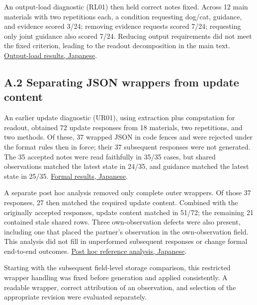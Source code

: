 \documentclass[10pt,a4paper]{article}
\begin{document}
An output-load diagnostic (RL01) then held correct notes fixed. Across 12 main materials with two repetitions each, a condition requesting dog/cat, guidance, and evidence scored 3/24; removing evidence requests scored 7/24; requesting only joint guidance also scored 7/24. Reducing output requirements did not meet the fixed criterion, leading to the readout decomposition in the main text. \href{https://github.com/metaSATOKEN/MRSI/blob/9443de315d283874df0c27e0e99b8c04f400709d/experiments/RL01/docs/readout-load-01-result-2026-09-25.md}{Output-load results, Japanese}.

\subsection{A.2 Separating JSON wrappers from update content}\label{paper-02-a.2-separating-json-wrappers-from-update-content}

An earlier update diagnostic (UR01), using extraction plus computation for readout, obtained 72 update responses from 18 materials, two repetitions, and two methods. Of these, 37 wrapped JSON in code fences and were rejected under the format rules then in force; their 37 subsequent responses were not generated. The 35 accepted notes were read faithfully in 35/35 cases, but shared observations matched the latest state in 24/35, and guidance matched the latest state in 25/35. \href{https://github.com/metaSATOKEN/MRSI/blob/9443de315d283874df0c27e0e99b8c04f400709d/experiments/UR01/docs/update-readout-01-result-2026-09-25.md}{Formal results, Japanese}.

A separate post hoc analysis removed only complete outer wrappers. Of those 37 responses, 27 then matched the required update content. Combined with the originally accepted responses, update content matched in 51/72; the remaining 21 contained stale shared rows. Three own-observation defects were also present, including one that placed the partner's observation in the own-observation field. This analysis did not fill in unperformed subsequent responses or change formal end-to-end outcomes. \href{https://github.com/metaSATOKEN/MRSI/blob/9443de315d283874df0c27e0e99b8c04f400709d/docs/study2/update-readout-01-envelope-reference-2026-09-25.md}{Post hoc reference analysis, Japanese}.

Starting with the subsequent field-level storage comparison, this restricted wrapper handling was fixed before generation and applied consistently. A readable wrapper, correct attribution of an observation, and selection of the appropriate revision were evaluated separately.
\end{document}
